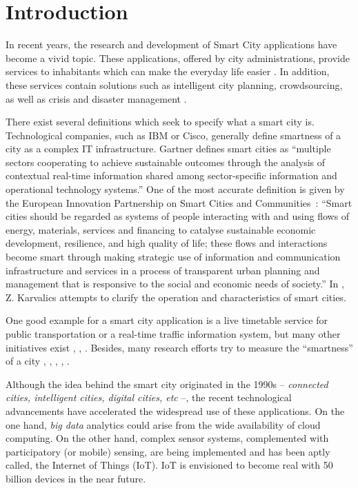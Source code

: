 \documentclass[b5paper,12pt]{report}
\theoremstyle{definition}
\begin{document}
\chapter{Introduction}

In recent years, the research and development of Smart City applications have become a vivid topic. These applications, offered by city administrations, provide services to inhabitants which can make the everyday life easier \cite{ismagilova2019smart}. In addition, these services contain solutions such as intelligent city planning, crowdsourcing, as well as crisis and disaster management \cite{Zheng2014}.

There exist several definitions which seek to specify what a smart city is. Technological companies, such as IBM or Cisco, generally define smartness of a city as a complex IT infrastructure. Gartner defines smart cities as \enquote{multiple sectors cooperating to achieve sustainable outcomes through the analysis of contextual real-time information shared among sector-specific information and operational technology systems.} One of the most accurate definition is given by the European Innovation Partnership on Smart Cities and Communities~\cite{eipscc}: \enquote{Smart cities should be regarded as systems of people interacting with and using flows of energy, materials, services and financing to catalyse sustainable economic development, resilience, and high quality of life; these flows and interactions become smart through making strategic use of information and communication infrastructure and services in a process of transparent urban planning and management that is responsive to the social and economic needs of society.} In \cite{z2017okos}, Z. Karvalics attempts to clarify the operation and characteristics of smart cities.

One good example for a smart city application is a live timetable service for public transportation or a real-time traffic information system, but many other initiatives exist \cite{icity}, \cite{fiware}, \cite{futureglasgow}. Besides, many research efforts try to measure the \enquote{smartness} of a city \cite{carli2013measuring}, \cite{de2014smart}, \cite{neirotti2014current}, \cite{yamauchi2014development}, \cite{giffinger2007smart}. 

Although the idea behind the smart city originated in the 1990s -- \textit{connected cities, intelligent cities, digital cities, etc} --, the recent technological advancements have accelerated the widespread use of these applications. On the one hand, \textit{big data} analytics could arise from the wide availability of cloud computing. On the other hand, complex sensor systems, complemented with participatory (or mobile) sensing, are being implemented and has been aptly called, the Internet of Things (IoT). IoT is envisioned to become real with 50 billion devices in the near future.
\end{document}

